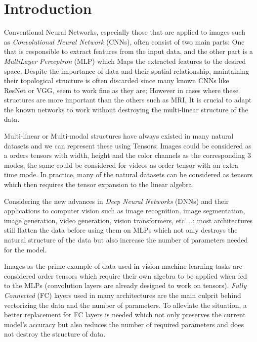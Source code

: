 \documentclass[runningheads]{llncs}
\begin{document}
\section{Introduction}
\label{sec:intro}

Conventional Neural Networks, especially those that are applied to images such as \textit{Convolutional Neural Network} (CNNs), often consist of two main parts: One that is responsible to extract features from the input data, and the other part is a \textit{MultiLayer Perceptron} (MLP) which Maps the extracted features to the desired space. Despite the importance of data and their spatial relationship, maintaining their topological structure is often discarded since many known CNNs like ResNet or VGG, seem to work fine as they are; However in cases where these structures are more important than the others such as MRI, It is crucial to adapt the known networks to work without destroying the multi-linear structure of the data.

Multi-linear or Multi-modal structures have always existed in many natural datasets and we can represent these using Tensors; Images could be considered as a  orders tensors with width, height and the color channels as the corresponding 3 modes, the same could be considered for videos as  order tensor with an extra time mode. In practice, many of the natural datasets can be considered as tensors which then requires the tensor expansion to the linear algebra. 

Considering the new advances in \textit{Deep Neural Networks} (DNNs) and their applications to computer vision such as image recognition, image segmentation, image generation, video generation, vision transformers, etc $\dots$; most architectures still flatten the data before using them on MLPs which not only destroys the natural structure of the data but also increase the number of parameters needed for the model. 

Images as the prime example of data used in vision machine learning tasks are considered  order tensors which require their own algebra to be applied when fed to the MLPs (convolution layers are already designed to work on tensors). \textit{Fully Connected} (FC) layers used in many architectures are the main culprit behind vectorizing the data and the number of parameters. To alleviate the situation, a better replacement for FC layers is needed which not only preserves the current model's accuracy but also reduces the number of required parameters and does not destroy the structure of data. 
\end{document}
